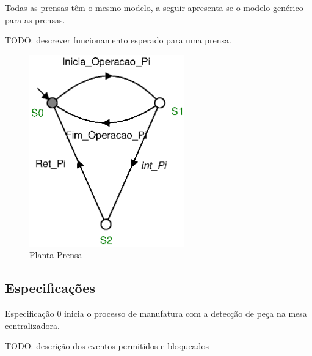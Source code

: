 Todas as prensas têm o mesmo modelo, a seguir apresenta-se o modelo genérico para as prensas.

TODO: descrever funcionamento esperado para uma prensa.

\begin{figure}[H]%
    \centering
    \includegraphics[width=0.6\textwidth]{imagens/Prensa.eps}
    \caption{Planta Prensa}\label{fig:prensa}
\end{figure}

\subsection{Especificações}
Especificação 0 inicia o processo de manufatura com a detecção de peça na mesa centralizadora.

TODO: descrição dos eventos permitidos e bloqueados

